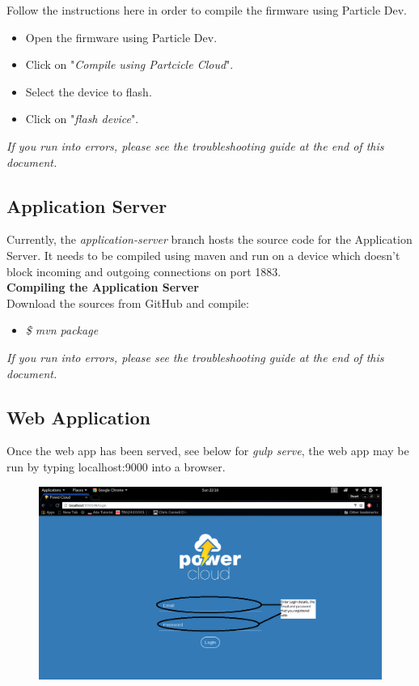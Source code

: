 \documentclass[a4paper,10pt]{article}
\begin{document}
			Follow the instructions here in order to compile the firmware using Particle 
			Dev.
			\\
			\begin{itemize}
				\item Open the firmware using Particle Dev.
				\item Click on "\textit{Compile using Partcicle Cloud}".
				\item Select the device to flash.
				\item Click on "\textit{flash device}".
			\end{itemize}
			
			\textit{If you run into errors, please see the troubleshooting guide at the end of this document.}
			
		\subsection{Application Server}
			Currently, the \textit{application-server} branch hosts the source code for 
			the Application Server. It needs to be compiled using maven and run on a 
			device which doesn't block incoming and outgoing connections on port 1883.\\
			
			\textbf{Compiling the Application Server}\\
			Download the sources from GitHub and compile:\\
			
			\begin{itemize}
				\item \textit{\$ mvn package}
			\end{itemize}		
				
			\textit{If you run into errors, please see the troubleshooting guide at the end of this document.}
						\newpage
			\subsection{Web Application}
			Once the web app has been served, see below for \textit{gulp serve}, the web
			app may be run by typing localhost:9000 into a browser.
				\begin{figure}[H]
						\includegraphics[scale=0.3]{images/login.png}
				\end{figure}
				
\end{document}
